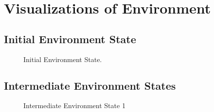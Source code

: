 \documentclass{article}
\begin{document}
\section{Visualizations of Environment}

\subsection{Initial Environment State}

\begin{figure}[H]
    \centering
    \caption{Initial Environment State.}
\end{figure}

\subsection{Intermediate Environment States}

\begin{figure}[H]
    \centering
    \caption{Intermediate Environment State 1}
  \end{figure}
\end{document}
